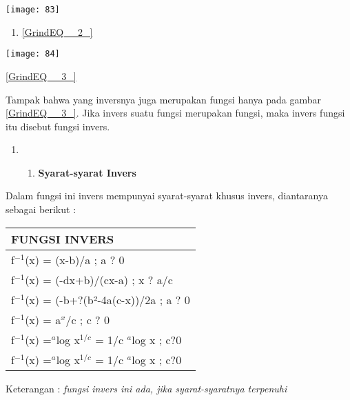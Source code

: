 \documentclass[11pt,fleqn]{book} %
\begin{document}
\begin{myEnumerate}
\begin{itemize}
\begin{center}
\texttt{[image: 83]}
\end{center}

\begin{enumerate}
\item  \eqref{GrindEQ__2_}
\end{enumerate}

\noindent 

\noindent 

\begin{center}
\noindent \texttt{[image: 84]}
\end{center}

\noindent \eqref{GrindEQ__3_}

\noindent 

Tampak bahwa yang inversnya juga merupakan fungsi hanya pada gambar \eqref{GrindEQ__3_}. Jika invers suatu fungsi merupakan fungsi, maka invers fungsi itu disebut fungsi invers.

\noindent \textbf{}

\begin{enumerate}
\item \begin{enumerate}
\item \textbf{ Syarat-syarat Invers }
\end{enumerate}
\end{enumerate}

Dalam fungsi ini invers mempunyai syarat-syarat khusus invers, diantaranya sebagai berikut :\textbf{}

\begin{tabular}{|p{3.1in}|} \hline 
\textbf{FUNGSI INVERS} \\ \hline 
f${}^{-1}$(x) = (x-b)/a ; a ? 0 \\ \hline 
f${}^{-1}$(x) = (-dx+b)/(cx-a) ; x ? a/c \\ \hline 
f${}^{-1}$(x) = (-b+?(b²-4a(c-x))/2a ; a ? 0 \\ \hline 
f${}^{-1}$(x) = a${}^{x}$/c ; c ? 0 \\ \hline 
f${}^{-1}$(x) =${}^{ a}$log x${}^{1/c}$ = 1/c ${}^{a}$log x ; c?0 \\ \hline 
f${}^{-1}$(x) =${}^{ a}$log x${}^{1/c}$ = 1/c ${}^{a}$log x ; c?0 \\ \hline 
\end{tabular}

Keterangan : \textit{fungsi invers ini ada, jika syarat-syaratnya terpenuhi}


\end{itemize}
\end{myEnumerate}
\end{document}

